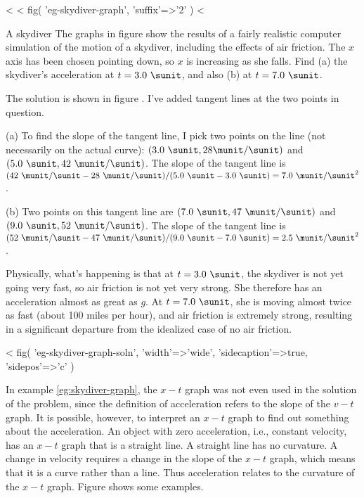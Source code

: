 <%
<%
  fig(
    'eg-skydiver-graph',
    {'suffix'=>'2'}
  )
<%
\begin{eg}{A skydiver}\label{eg:skydiver-graph}
\egquestion The graphs in figure 
show the results of a fairly realistic
computer simulation of the motion of a skydiver, including
the effects of air friction. The $x$ axis has been chosen
pointing down, so $x$ is increasing as she falls. Find (a)
the skydiver's acceleration at $t=3.0\ \sunit$, and also (b) at $t=7.0\ \sunit$.

\eganswer The solution is shown in figure .
I've added tangent lines at the two points in question.

(a) To find the slope of the tangent line, I pick two points
on the line (not necessarily on the actual curve): 
$(3.0\ \sunit,28 \munit/\sunit)$ and $(5.0\ \sunit,42\ \munit/\sunit)$.
The slope of the tangent line
is 
$(42\ \munit/\sunit-28\ \munit/\sunit)/(5.0\ \sunit - 3.0\ \sunit)=7.0\ \munit/\sunit^2$.

(b) Two points on this tangent line are 
$(7.0\ \sunit,47\ \munit/\sunit)$
and 
$(9.0\ \sunit, 52\ \munit/\sunit)$. 
The slope of the tangent line is 
$(52\ \munit/\sunit-47\ \munit/\sunit)/(9.0\ \sunit - 7.0\ \sunit)=2.5\ \munit/\sunit^2$.

Physically, what's happening is that at $t=3.0\ \sunit$, the
skydiver is not yet going very fast, so air friction is not
yet very strong. She therefore has an acceleration almost as
great as $g$. At $t=7.0\ \sunit$, she is moving almost twice as
fast (about 100 miles per hour), and air friction is
extremely strong, resulting in a significant departure from
the idealized case of no air friction.
\end{eg}
<%
  fig(
    'eg-skydiver-graph-soln',
    {
      'width'=>'wide',
      'sidecaption'=>true,
      'sidepos'=>'c'
    }
  )

In example \ref{eg:skydiver-graph}, the $x-t$ graph was not even used in
the solution of the problem, since the definition of
acceleration refers to the slope of the $v-t$ graph. It is
possible, however, to interpret an $x-t$ graph to find out
something about the acceleration. An object with zero
acceleration, i.e., constant velocity, has an $x-t$ graph
that is a straight line. A straight line has no curvature. A
change in velocity requires a change in the slope of the $x-t$
graph, which means that it is a curve rather than a line.
Thus acceleration relates to the curvature of the $x-t$
graph. Figure  shows some examples.

